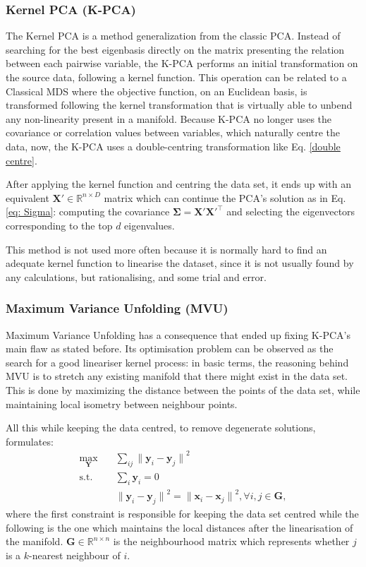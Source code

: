     \subsubsection{Kernel PCA (K-PCA)}
        The Kernel PCA \cite{k-pca} is a method generalization from the classic PCA. Instead of searching for the best eigenbasis directly on the matrix presenting the relation between each pairwise variable, the K-PCA performs an initial transformation on the source data, following a kernel function. This operation can be related to a Classical MDS where the objective function, on an Euclidean basis, is transformed following the kernel transformation that is virtually able to unbend any non-linearity present in a manifold. Because K-PCA no longer uses the covariance or correlation values between variables, which naturally centre the data, now, the K-PCA uses a double-centring transformation like Eq. \ref{double centre}.

        After applying the kernel function and centring the data set, it ends up with an equivalent $\bm{X'}\in\mathbb{R}^{n\times D}$ matrix which can continue the PCA's solution as in Eq. \ref{eq: Sigma}: computing the covariance $\bm{\Sigma} = \bm{X}'\bm{X}'^\top$ and selecting the eigenvectors corresponding to the top $d$ eigenvalues.

        This method is not used more often because it is normally hard to find an adequate kernel function to linearise the dataset, since it is not usually found by any calculations, but rationalising, and some trial and error.
    
    \subsubsection{Maximum Variance Unfolding (MVU)}
    
    Maximum Variance Unfolding \cite{mvu} has a consequence that ended up fixing K-PCA's main flaw as stated before. Its optimisation problem can be observed as the search for a good lineariser kernel process: in basic terms, the reasoning behind MVU is to stretch any existing manifold that there might exist in the data set. This is done by maximizing the distance between the points of the data set, while maintaining local isometry between neighbour points.
    
    All this while keeping the data centred, to remove degenerate solutions, formulates:
    \begin{align}
        \max_{\bm{Y}} \quad & \sum_{ij} {\| \bm{y}_i - \bm{y}_j \|}^2 \\
        \textrm{s.t.} \quad 
            & \sum_i \bm{y}_i = 0\\
            & {\| \bm{y}_i - \bm{y}_j \|}^2 = {\| \bm{x}_i - \bm{x}_j \|}^2, \forall{i,j} \in\bm{G},
    \end{align}
    where the first constraint is responsible for keeping the data set centred while the following is the one which maintains the local distances after the linearisation of the manifold. $\bm{G}\in\mathbb{R}^{n\times n}$ is the neighbourhood matrix which represents whether $j$ is a $k$-nearest neighbour of $i$.
    
